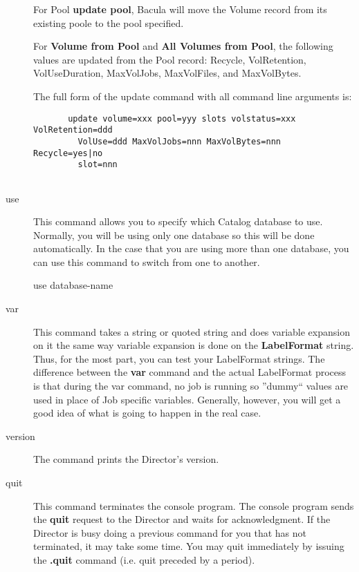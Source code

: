 \begin{description}
For Pool {\bf update pool}, Bacula will move  the Volume record from its
existing poole to the pool specified.  

For {\bf Volume from Pool} and {\bf All Volumes from Pool},  the following
values are updated from the Pool record:  Recycle, VolRetention,
VolUseDuration, MaxVolJobs, MaxVolFiles,  and MaxVolBytes.  

The full form of the update command with all command line  arguments is:  

\footnotesize
\begin{verbatim}
       update volume=xxx pool=yyy slots volstatus=xxx VolRetention=ddd
         VolUse=ddd MaxVolJobs=nnn MaxVolBytes=nnn Recycle=yes|no
         slot=nnn
      
\end{verbatim}
\normalsize

\item [use]
   This command allows you to specify which Catalog  database to use. Normally,
you will be using only one database so  this will be done automatically. In
the case that you are using  more than one database, you can use this command
to switch from  one to another.  

use \lt{}database-name\gt{} 

\item [var]
   \label{var}
This command takes a string or quoted string and  does variable expansion on
it the same way variable expansion  is done on the {\bf LabelFormat} string.
Thus, for the  most part, you can test your LabelFormat strings. The
difference  between the {\bf var} command and the actual LabelFormat process 
is that during the var command, no job is running so ''dummy``  values are
used in place of Job specific variables. Generally,  however, you will get a
good idea of what is going to happen  in the real case.  

\item [version]
   The command prints the Director's version.  

\item [quit]
   This command terminates the console program. The  console program sends the
{\bf quit} request to the Director  and waits for acknowledgment. If the
Director is busy doing  a previous command for you that has not terminated, it
may  take some time. You may quit immediately by issuing the  {\bf .quit}
command (i.e. quit preceded by a period).  


\end{description}
